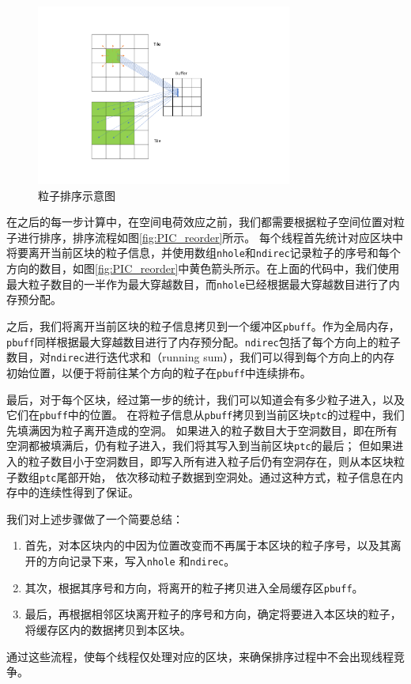 \begin{figure}[!htb]
    \centering
    \includegraphics[width=0.75\textwidth]{Img/3PIC_reorder.pdf}
    \caption{粒子排序示意图}
    \label{fig:PIC_reorder}
\end{figure}
在之后的每一步计算中，在空间电荷效应之前，我们都需要根据粒子空间位置对粒子进行排序，排序流程如图\eqref{fig:PIC_reorder}所示。
每个线程首先统计对应区块中将要离开当前区块的粒子信息，并使用数组\verb"nhole"和\verb"ndirec"记录粒子的序号和每个方向的数目，如图\eqref{fig:PIC_reorder}中黄色箭头所示。在上面的代码中，我们使用最大粒子数目的一半作为最大穿越数目，而\verb"nhole"已经根据最大穿越数目进行了内存预分配。

之后，我们将离开当前区块的粒子信息拷贝到一个缓冲区\verb"pbuff"。作为全局内存，\verb"pbuff"同样根据最大穿越数目进行了内存预分配。\verb"ndirec"包括了每个方向上的粒子数目，对\verb"ndirec"进行迭代求和（running sum），我们可以得到每个方向上的内存初始位置，以便于将前往某个方向的粒子在\verb"pbuff"中连续排布。

最后，对于每个区块，经过第一步的统计，我们可以知道会有多少粒子进入，以及它们在\verb"pbuff"中的位置。
在将粒子信息从\verb"pbuff"拷贝到当前区块\verb"ptc"的过程中，我们先填满因为粒子离开造成的空洞。
如果进入的粒子数目大于空洞数目，即在所有空洞都被填满后，仍有粒子进入，我们将其写入到当前区块\verb"ptc"的最后；
但如果进入的粒子数目小于空洞数目，即写入所有进入粒子后仍有空洞存在，则从本区块粒子数组\verb"ptc"尾部开始，
依次移动粒子数据到空洞处。通过这种方式，粒子信息在内存中的连续性得到了保证。

我们对上述步骤做了一个简要总结：
\begin{enumerate}
  \item 首先，对本区块内的中因为位置改变而不再属于本区块的粒子序号，以及其离开的方向记录下来，写入\verb"nhole" 和\verb"ndirec"。
  \item 其次，根据其序号和方向，将离开的粒子拷贝进入全局缓存区\verb"pbuff"。
  \item 最后，再根据相邻区块离开粒子的序号和方向，确定将要进入本区块的粒子，将缓存区内的数据拷贝到本区块。
\end{enumerate}
通过这些流程，使每个线程仅处理对应的区块，来确保排序过程中不会出现线程竞争。


